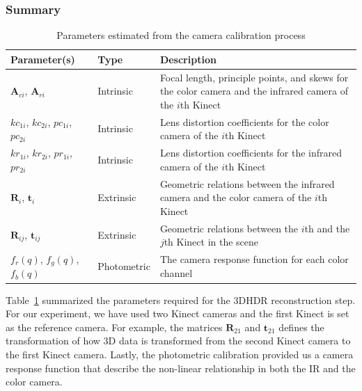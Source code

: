 \subsubsection{Summary}


\begin{table}[h]\footnotesize
\centering
  \caption{Parameters estimated from the camera calibration process}
  \label{tab_calibration}
    \begin{tabular}{|p{2.0cm}|l|p{4.0cm}|}
        \hline
       \bf{Parameter(s)}        &  \bf{Type}      &  \bf{Description}                                                        \\ \hline
        $\mathbf{A}_{ci}$, $\mathbf{A}_{ri}$  & Intrinsic & Focal length, principle points, and skews for the color camera and the infrared camera of the $i$th Kinect \\ \hline
        $kc_{1i}$, $kc_{2i}$, $pc_{1i}$, $pc_{2i}$  & Intrinsic & Lens distortion coefficients for the color camera of the $i$th Kinect \\  \hline
        $kr_{1i}$, $kr_{2i}$, $pr_{1i}$, $pr_{2i}$  & Intrinsic & Lens distortion coefficients for the infrared camera of the $i$th Kinect \\ \hline
        $\mathbf{R}_i$, $\mathbf{t}_i$             & Extrinsic & Geometric relations between the infrared camera and the color camera of the $i$th Kinect \\ \hline
        $\mathbf{R}_{ij}$, $\mathbf{t}_{ij}$    & Extrinsic & Geometric relations between the $i$th and the $j$th Kinect in the scene \\
        \hline
        $f_r(q)$, $f_g(q)$, $f_b(q)$    & Photometric & The camera response function for each color channel\\
        \hline
    \end{tabular}
\end{table}

Table~\ref{tab_calibration} summarized the parameters required for the 3DHDR reconstruction step. For our experiment, we have used two Kinect cameras and the first Kinect is set as the reference camera. For example, the matrices $\mathbf{R}_{21}$ and $\mathbf{t}_{21}$ defines the transformation of how 3D data is transformed from the second Kinect camera to the first Kinect camera. Lastly, the photometric calibration  provided us a camera response function that describe the non-linear relationship in both the IR and the color camera.

